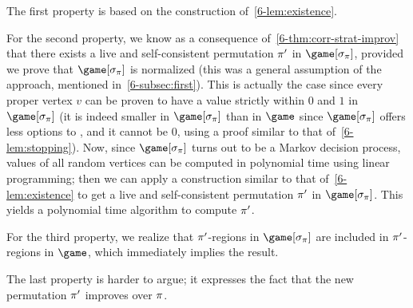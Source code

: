 The first property is based on the construction of~\cref{6-lem:existence}.

For the second property, we know as a consequence of~\cref{6-thm:corr-strat-improv} that there exists a live and
self-consistent permutation $\pi'$ in $\game[\sigma_{\perm}]$,
provided we prove that $\game[\sigma_{\perm}]$ is normalized (this was
a general assumption of the approach, mentioned in~\cref{6-subsec:first}). This is actually the case since
every proper vertex $v$ can be proven to have a value strictly within
$0$ and $1$ in $\game[\sigma_{\perm}]$ (it is indeed smaller in
$\game[\sigma_{\perm}]$ than in $\game$ since $\game[\sigma_{\perm}]$
offers less options to \Eve, and it cannot be $0$, using a proof
similar to that of~\cref{6-lem:stopping}).
Now, since $\game[\sigma_\perm]$ turns out to be a Markov decision
process, values of all random vertices can be computed in polynomial
time using linear programming; then we can apply a construction
similar to that of~\cref{6-lem:existence} to get a live and
self-consistent permutation $\pi'$ in $\game[\sigma_\perm]$. This
yields a polynomial time algorithm to compute $\pi'$.

For the third property, we realize that
$\pi'$-regions in $\game[\sigma_\perm]$ are included in
$\pi'$-regions in $\game$, which immediately implies the result.


The last property is harder to argue; it expresses the fact that the
new permutation $\pi'$ improves over $\pi$.  %

